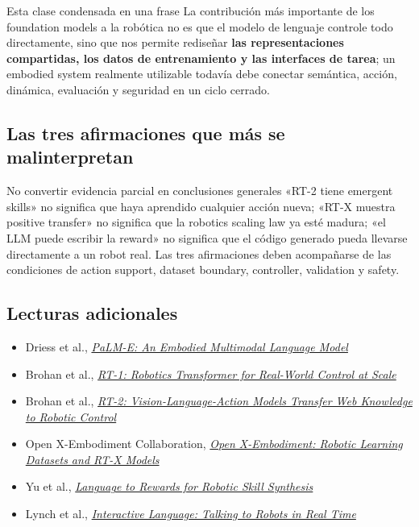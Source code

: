 \begin{importantbox}{Esta clase condensada en una frase}
La contribución más importante de los foundation models a la robótica no es que el modelo de lenguaje controle todo directamente, sino que nos permite rediseñar \textbf{las representaciones compartidas, los datos de entrenamiento y las interfaces de tarea}; un embodied system realmente utilizable todavía debe conectar semántica, acción, dinámica, evaluación y seguridad en un ciclo cerrado.
\end{importantbox}

\subsection{Las tres afirmaciones que más se malinterpretan}

\begin{warningbox}{No convertir evidencia parcial en conclusiones generales}
«RT-2 tiene emergent skills» no significa que haya aprendido cualquier acción nueva; «RT-X muestra positive transfer» no significa que la robotics scaling law ya esté madura; «el LLM puede escribir la reward» no significa que el código generado pueda llevarse directamente a un robot real. Las tres afirmaciones deben acompañarse de las condiciones de action support, dataset boundary, controller, validation y safety.
\end{warningbox}

\subsection{Lecturas adicionales}

\begin{itemize}
  \item Driess et al., \href{https://arxiv.org/abs/2303.03378}{\emph{PaLM-E: An Embodied Multimodal Language Model}}
  \item Brohan et al., \href{https://arxiv.org/abs/2212.06817}{\emph{RT-1: Robotics Transformer for Real-World Control at Scale}}
  \item Brohan et al., \href{https://arxiv.org/abs/2307.15818}{\emph{RT-2: Vision-Language-Action Models Transfer Web Knowledge to Robotic Control}}
  \item Open X-Embodiment Collaboration, \href{https://arxiv.org/abs/2310.08864}{\emph{Open X-Embodiment: Robotic Learning Datasets and RT-X Models}}
  \item Yu et al., \href{https://arxiv.org/abs/2306.08647}{\emph{Language to Rewards for Robotic Skill Synthesis}}
  \item Lynch et al., \href{https://arxiv.org/abs/2206.04717}{\emph{Interactive Language: Talking to Robots in Real Time}}
\end{itemize}

